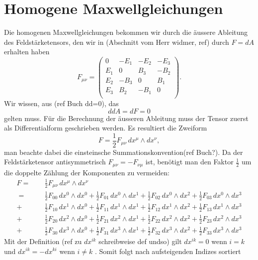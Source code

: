 \section{Homogene Maxwellgleichungen}
Die homogenen Maxwellgleichungen bekommen wir durch die äussere Ableitung des Feldstärketensors, den wir in (Abschnitt vom Herr widmer, ref) durch $F = dA$ erhalten haben
\[
F_{\mu\nu}
= 
\begin{pmatrix}
	0 & -E_1 & -E_2 & -E_3 \\
	E_1 &  0 &  B_3 & -B_2 \\
	E_2 & -B_3 &  0 &  B_1 \\
	E_3 &  B_2 & -B_1 &  0 \\
\end{pmatrix}.
\]
Wir wissen, aus (ref Buch dd=0), das
\[
ddA = dF = 0
\]
gelten muss.
Für die Berechnung der äusseren Ableitung muss der Tensor zuerst als Differentialform geschrieben werden.
Es resultiert die Zweiform
\[
F
= \frac{1}{2} F_{\mu\nu} \, dx^\mu \wedge dx^\nu,
\]
man beachte dabei die einsteinsche Summationskonvention(ref Buch?).
Da der Feldstärketensor antisymmetrisch $F_{\mu\nu} = -F_{\nu\mu}$ ist, benötigt man den Faktor $\frac{1}{2}$ um die doppelte Zählung der Komponenten zu vermeiden:
\begin{align*}
	F
	= 
	\phantom{+} &\frac{1}{2} F_{\mu\nu} \, dx^\mu \wedge dx^\nu
	\\
	=
	\phantom{+} &\frac{1}{2} F_{00} \, dx^0 \wedge dx^0 + \frac{1}{2} F_{01} \, dx^0 \wedge dx^1 + \frac{1}{2} F_{02} \, dx^0 \wedge dx^2 + \frac{1}{2} F_{03} \, dx^0 \wedge dx^3
	\\
	+ &\frac{1}{2} F_{10} \, dx^1 \wedge dx^0 + \frac{1}{2} F_{11} \, dx^1 \wedge dx^1 + \frac{1}{2} F_{12} \, dx^1 \wedge dx^2 + \frac{1}{2} F_{13} \, dx^1 \wedge dx^3
	\\
	+ &\frac{1}{2} F_{20} \, dx^2 \wedge dx^0 + \frac{1}{2} F_{21} \, dx^2 \wedge dx^1 + \frac{1}{2} F_{22} \, dx^2 \wedge dx^2 + \frac{1}{2} F_{23} \, dx^2 \wedge dx^3
	\\
	+ &\frac{1}{2} F_{30} \, dx^3 \wedge dx^0 + \frac{1}{2} F_{31} \, dx^3 \wedge dx^1 + \frac{1}{2} F_{32} \, dx^3 \wedge dx^2 + \frac{1}{2} F_{33} \, dx^3 \wedge dx^3
\end{align*} 
Mit der Definition (ref zu $dx^{ik}$ schreibweise def undso) gilt $dx^{ik} = 0$ wenn $i=k$ und $dx^{ik} = -dx^{ki}$ wenn $i \neq k $ . Somit folgt nach aufsteigenden Indizes sortiert
